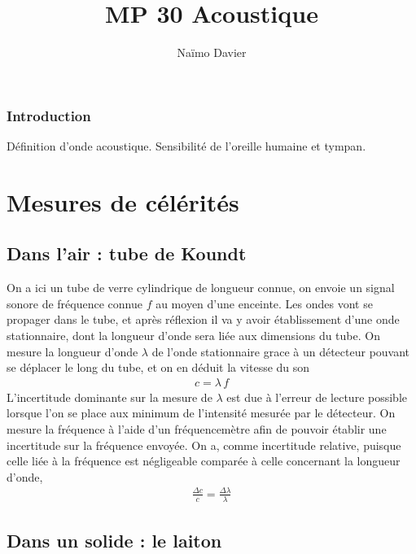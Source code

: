 \documentclass[12pt,prb,aps,epsf]{article}
\begin{document}
	
	\title{MP 30 Acoustique}
	\author{Naïmo Davier}
	
	\maketitle
	
	\tableofcontents
	
	\pagebreak
	
	
\subsubsection{Introduction}
Définition d'onde acoustique. Sensibilité de l'oreille humaine et tympan.

\section{Mesures de célérités}
\subsection{Dans l'air : tube de Koundt}
On a ici un tube de verre cylindrique de longueur connue, on envoie un signal sonore de fréquence connue $f$ au moyen d'une enceinte. Les ondes vont se propager dans le tube, et après réflexion il va y avoir établissement d'une onde stationnaire, dont la longueur d'onde sera liée aux dimensions du tube. On mesure la longueur d'onde $\lambda$ de l'onde stationnaire grace à un détecteur pouvant se déplacer le long du tube, et on en déduit la vitesse du son 
\begin{eqnarray}
c =  \lambda\,f
\end{eqnarray}
L'incertitude dominante sur la mesure de $\lambda$ est due à l'erreur de lecture possible lorsque l'on se place aux minimum de l'intensité mesurée par le détecteur. On mesure la fréquence à l'aide d'un fréquencemètre afin de pouvoir établir une incertitude sur la fréquence envoyée.
On a, comme incertitude relative, puisque celle liée à la fréquence est négligeable comparée à celle concernant la longueur d'onde,
\begin{eqnarray}
\frac{\Delta c}{c} = \frac{\Delta \lambda}{\lambda}
\end{eqnarray}

\subsection{Dans un solide : le laiton}
\end{document}
